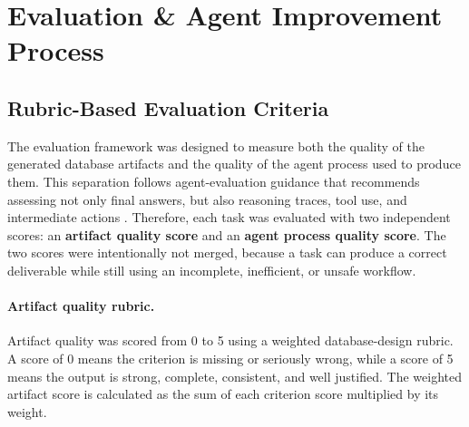 \section{Evaluation \& Agent Improvement Process}
\subsection{Rubric-Based Evaluation Criteria}
The evaluation framework was designed to measure both the quality of the generated database artifacts and the quality of the agent process used to produce them. This separation follows agent-evaluation guidance that recommends assessing not only final answers, but also reasoning traces, tool use, and intermediate actions \cite{deepeval-agent-eval,google-agent-eval,braintrust-agent-eval,openlayer-agent-eval}. Therefore, each task was evaluated with two independent scores: an \textbf{artifact quality score} and an \textbf{agent process quality score}. The two scores were intentionally not merged, because a task can produce a correct deliverable while still using an incomplete, inefficient, or unsafe workflow.

\paragraph{Artifact quality rubric.}
Artifact quality was scored from 0 to 5 using a weighted database-design rubric. A score of 0 means the criterion is missing or seriously wrong, while a score of 5 means the output is strong, complete, consistent, and well justified. The weighted artifact score is calculated as the sum of each criterion score multiplied by its weight.

